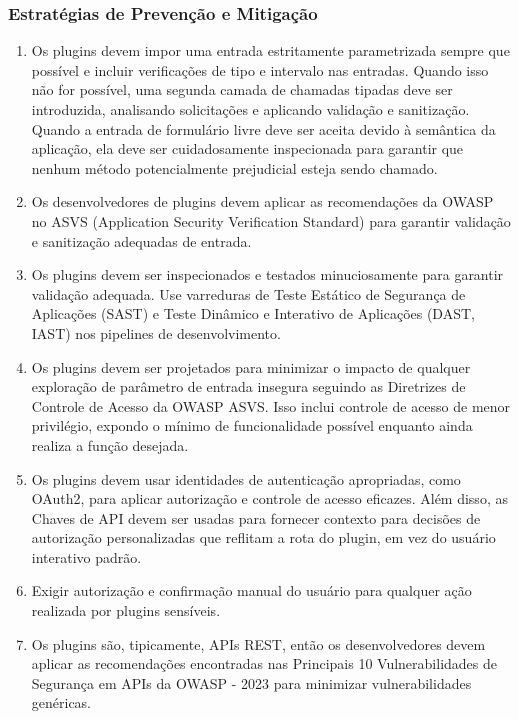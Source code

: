 \documentclass[
]{article}
\providecommand{\tightlist}{%
  \setlength{\itemsep}{0pt}\setlength{\parskip}{0pt}}
\begin{document}
\subsubsection{Estratégias de Prevenção e
Mitigação}\label{estratuxe9gias-de-prevenuxe7uxe3o-e-mitigauxe7uxe3o}

\begin{enumerate}
\def\labelenumi{\arabic{enumi}.}
\tightlist
\item
  Os plugins devem impor uma entrada estritamente parametrizada sempre
  que possível e incluir verificações de tipo e intervalo nas entradas.
  Quando isso não for possível, uma segunda camada de chamadas tipadas
  deve ser introduzida, analisando solicitações e aplicando validação e
  sanitização. Quando a entrada de formulário livre deve ser aceita
  devido à semântica da aplicação, ela deve ser cuidadosamente
  inspecionada para garantir que nenhum método potencialmente
  prejudicial esteja sendo chamado.
\item
  Os desenvolvedores de plugins devem aplicar as recomendações da OWASP
  no ASVS (Application Security Verification Standard) para garantir
  validação e sanitização adequadas de entrada.
\item
  Os plugins devem ser inspecionados e testados minuciosamente para
  garantir validação adequada. Use varreduras de Teste Estático de
  Segurança de Aplicações (SAST) e Teste Dinâmico e Interativo de
  Aplicações (DAST, IAST) nos pipelines de desenvolvimento.
\item
  Os plugins devem ser projetados para minimizar o impacto de qualquer
  exploração de parâmetro de entrada insegura seguindo as Diretrizes de
  Controle de Acesso da OWASP ASVS. Isso inclui controle de acesso de
  menor privilégio, expondo o mínimo de funcionalidade possível enquanto
  ainda realiza a função desejada.
\item
  Os plugins devem usar identidades de autenticação apropriadas, como
  OAuth2, para aplicar autorização e controle de acesso eficazes. Além
  disso, as Chaves de API devem ser usadas para fornecer contexto para
  decisões de autorização personalizadas que reflitam a rota do plugin,
  em vez do usuário interativo padrão.
\item
  Exigir autorização e confirmação manual do usuário para qualquer ação
  realizada por plugins sensíveis.
\item
  Os plugins são, tipicamente, APIs REST, então os desenvolvedores devem
  aplicar as recomendações encontradas nas Principais 10
  Vulnerabilidades de Segurança em APIs da OWASP - 2023 para minimizar
  vulnerabilidades genéricas.
\end{enumerate}
\end{document}
